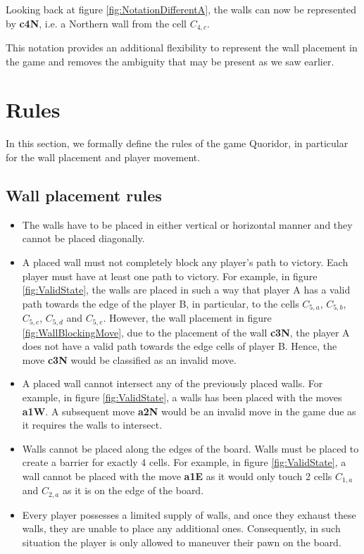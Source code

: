 Looking back at figure \ref{fig:NotationDifferentA}, the walls can now be represented by \textbf{c4N}, i.e. a Northern wall from the cell $C_{4, c}$.

This notation provides an additional flexibility to represent the wall placement in the game and removes the ambiguity that may be present as we saw earlier.

\section {Rules}
In this section, we formally define the rules of the game Quoridor, in particular for the wall placement and player movement.

\subsection{Wall placement rules}
\label{WallRules}

\begin{itemize}
    \item The walls have to be placed in either vertical or horizontal manner and they cannot be placed diagonally.
    \item A placed wall must not completely block any player's path to victory. Each player must have at least
        one path to victory. For example, in figure \ref{fig:ValidState}, the walls are placed in such a way that player A has a valid path towards the edge of the player B, in particular, to the cells $C_{5, a}$, $C_{5, b}$, $C_{5, c}$, $C_{5, d}$ and $C_{5, e}$. However, the wall placement in figure \ref{fig:WallBlockingMove}, due to the placement of the wall \textbf{c3N}, the player A does not have a valid path towards the edge cells of player B. Hence, the move \textbf{c3N} would be classified as an invalid move.
    \item A placed wall cannot intersect any of the previously placed walls. For example, in figure \ref{fig:ValidState}, a walls has been placed with the moves \textbf{a1W}. A subsequent move \textbf{a2N} would be an invalid move in the game due as it requires the walls to intersect.
    \item Walls cannot be placed along the edges of the board. Walls must be placed to create a barrier for exactly 4 cells. For example, in figure \ref{fig:ValidState}, a wall cannot be placed with the move \textbf{a1E} as it would only touch 2 cells $C_{1, a}$ and $C_{2, a}$ as it is on the edge of the board.
    \item  Every player possesses a limited supply of walls, and once they exhaust these walls, they are unable to place any additional ones. Consequently, in such situation the player is only allowed to maneuver their pawn on the
        board.
\end{itemize}

